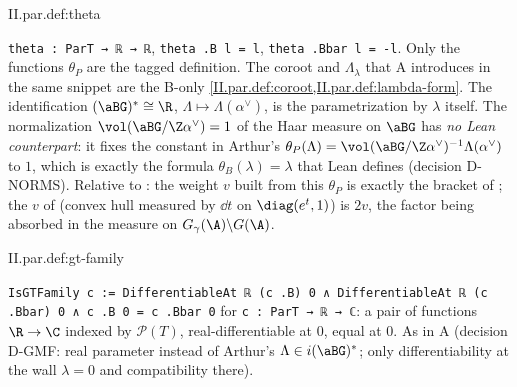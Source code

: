 \begin{definition}
\end{definition}
\begin{tfformal}{II.par.def:theta}
\begin{tffidelity}
\texttt{theta : ParT → ℝ → ℝ}, \texttt{theta .B l = l}, \texttt{theta .Bbar l = -l}. Only the functions $\theta_P$ are the tagged definition. The coroot and $\Lambda_\lambda$ that A introduces in the same snippet are the B-only \cref{II.par.def:coroot,II.par.def:lambda-form}. The identification $(\aBG)^*\cong\R$, $\Lambda\mapsto\Lambda(\alpha^\vee)$, is the parametrization by $\lambda$ itself. The normalization $\vol(\aBG/\Z\alpha^\vee)=1$ of the Haar measure on $\aBG$ has \emph{no Lean counterpart}: it fixes the constant in Arthur's $\theta_P(\Lambda)=\vol(\aBG/\Z\alpha^\vee)^{-1}\Lambda(\alpha^\vee)$ to $1$, which is exactly the formula $\theta_B(\lambda)=\lambda$ that Lean defines (decision D-NORMS). Relative to \cite{Gel}: the weight $v$ built from this $\theta_P$ is exactly the bracket of \cite[Lecture IV, Prop.~1.1]{Gel}; the $v$ of \cite[Lecture IV, §3]{Gel} (convex hull measured by $\dd t$ on $\diag(e^t,1)$) is $2v$, the factor being absorbed in the measure on $G_\gamma(\A)\backslash G(\A)$.
\end{tffidelity}
\end{tfformal}

\begin{definition}[$(G,T)$-families]
\end{definition}
\begin{tfformal}{II.par.def:gt-family}
\begin{tffidelity}
\texttt{IsGTFamily c := DifferentiableAt ℝ (c .B) 0 ∧ DifferentiableAt ℝ (c .Bbar) 0 ∧ c .B 0 = c .Bbar 0} for \texttt{c : ParT → ℝ → ℂ}: a pair of functions $\R\to\C$ indexed by $\mathcal P(T)$, real-differentiable at $0$, equal at $0$. As in A (decision D-GMF: real parameter instead of Arthur's $\Lambda\in i(\aBG)^*$; only differentiability at the wall $\lambda=0$ and compatibility there).
\end{tffidelity}
\end{tfformal}

